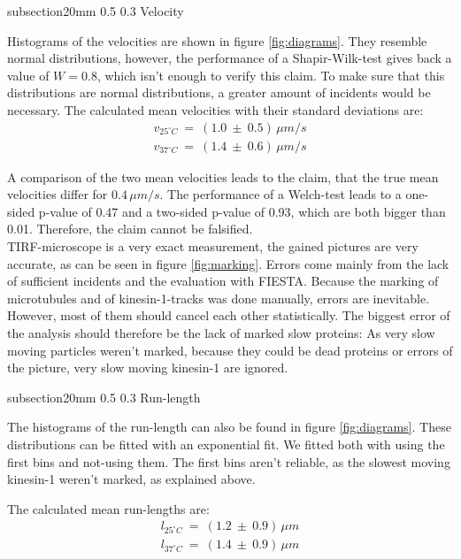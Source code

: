 \documentclass[english, %
parskip=full, %
bibliography=totoc, %
]{scrartcl}
\makeatletter
\renewcommand\subsection{\@startsection 
   {subsection}{2}{0mm}%
   {0.5\baselineskip}%
   {0.3\baselineskip}%
   {\bfseries\sffamily\large}%
   }
\makeatother
\begin{document}
\subsection{Velocity}

Histograms of the velocities are shown in figure \ref{fig:diagrams}. They resemble normal distributions, however, the performance of a Shapir-Wilk-test gives back a value of $W = 0.8$, which isn't enough to verify this claim. To make sure that this distributions are normal distributions, a greater amount of incidents would be necessary. The calculated mean velocities with their standard deviations are:
\begin{align*}
v _{25^\circ C} \ = \ (1.0 \ \pm \ 0.5) \, \mu m/s \\
v _{37^\circ C} \ = \ (1.4 \ \pm \ 0.6) \, \mu m/s
\end{align*}

A comparison of the two mean velocities leads to the claim, that the true mean velocities differ for $0.4\, \mu m/s$. The performance of a Welch-test leads to a one-sided p-value of 0.47 and a two-sided p-value of 0.93, which are both bigger than 0.01. Therefore, the claim cannot be falsified. \\
TIRF-microscope is a very exact measurement, the gained pictures are very accurate, as can be seen in figure \ref{fig:marking}. Errors come mainly from the lack of sufficient incidents and the evaluation with FIESTA. Because the marking of microtubules and of kinesin-1-tracks was done manually, errors are inevitable. However, most of them should cancel each other statistically. The biggest error of the analysis should therefore be the lack of marked slow proteins: As very slow moving particles weren't marked, because they could be dead proteins or errors of the picture, very slow moving kinesin-1 are ignored.

\subsection{Run-length}

The histograms of the run-length can also be found in figure \ref{fig:diagrams}. These distributions can be fitted with an exponential fit. We fitted both with using the first bins and not-using them. The first bins aren't reliable, as the slowest moving kinesin-1 weren't marked, as explained above. 

The calculated mean run-lengths are:
\begin{align*}
l _{25^\circ C} \ = \ (1.2 \ \pm \ 0.9) \, \mu m \\
l _{37^\circ C} \ = \ (1.4 \ \pm \ 0.9) \, \mu m
\end{align*}
\end{document}
